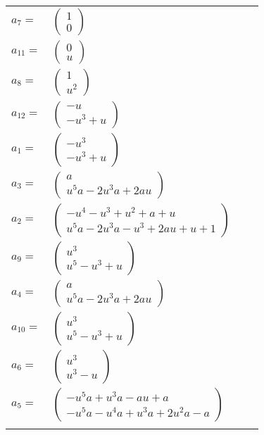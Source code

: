 \documentclass[1p]{elsarticle_modified}
\theoremstyle{definition}
\begin{document}
\begin{tabular}{m{7pt} m{180pt} m{7pt} m{180pt} }
\flushright $a_{7}=$&$\begin{pmatrix}1\\0\end{pmatrix}$ \\
\flushright $a_{11}=$&$\begin{pmatrix}0\\u\end{pmatrix}$ \\
\flushright $a_{8}=$&$\begin{pmatrix}1\\u^2\end{pmatrix}$ \\
\flushright $a_{12}=$&$\begin{pmatrix}- u\\- u^3+u\end{pmatrix}$ \\
\flushright $a_{1}=$&$\begin{pmatrix}- u^3\\- u^3+u\end{pmatrix}$ \\
\flushright $a_{3}=$&$\begin{pmatrix}a\\u^5 a-2 u^3 a+2 a u\end{pmatrix}$ \\
\flushright $a_{2}=$&$\begin{pmatrix}- u^4- u^3+u^2+a+u\\u^5 a-2 u^3 a- u^3+2 a u+u+1\end{pmatrix}$ \\
\flushright $a_{9}=$&$\begin{pmatrix}u^3\\u^5- u^3+u\end{pmatrix}$ \\
\flushright $a_{4}=$&$\begin{pmatrix}a\\u^5 a-2 u^3 a+2 a u\end{pmatrix}$ \\
\flushright $a_{10}=$&$\begin{pmatrix}u^3\\u^5- u^3+u\end{pmatrix}$ \\
\flushright $a_{6}=$&$\begin{pmatrix}u^3\\u^3- u\end{pmatrix}$ \\
\flushright $a_{5}=$&$\begin{pmatrix}- u^5 a+u^3 a- a u+a\\- u^5 a- u^4 a+u^3 a+2 u^2 a- a\end{pmatrix}$\\&\end{tabular}
\end{document}
